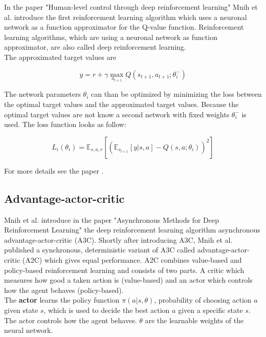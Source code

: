 In the paper "Human-level control through deep reinforcement learning" Mnih et al. \cite{dqn} introduce the first reinforcement learning algorithm which uses a neuronal network as a function approximator for the Q-value function. Reinforcement learning algorithms, which are using a neuronal network as function approximator, are also called deep reinforcement learning.\\

The approximated target values are

\begin{equation} \label{eq:1}
y = r + \gamma \max_{a_{t+1}} Q(s_{t+1}, a_{t+1}; \theta_i^-)
\end{equation}

The network parameters $\theta_i$ can than be optimized by minimizing the loss between the optimal target values and the approximated target values. Because the optimal target values are not know a second network with fixed weights $\theta_i^-$ is used. The loss function looks as follow:

\begin{equation} \label{eq:dqn_loss}
L_i(\theta_i) = \mathbb{E}_{s, a, r}[(\mathbb{E}_{s_{t+1}} [ y | s, a] - Q(s, a; \theta_i))^2]
\end{equation}


For more details see the paper \cite{dqn}.\\



\subsection{Advantage-actor-critic}
\label{sec:a2c}

Mnih et al. introduce in the paper "Asynchronous Methods for Deep Reinforcement Learning" \cite{A3C} the deep reinforcement learning algorithm asynchronous advantage-actor-critic (A3C). Shortly after introducing A3C, Mnih et al. published a synchronous, deterministic variant of A3C called advantage-actor-critic (A2C) which gives equal performance.
A2C combines value-based and policy-based reinforcement learning and consists of two parts. A critic which measures how good a taken action is (value-based) and an actor which controls how the agent behaves (policy-based).\\

The \textbf{actor} learns the policy function $\pi(a | s, \theta)$, probability of choosing action $a$ given state $s$, which is used to decide the best action $a$ given a specific state $s$.
The actor controls how the agent behaves.
$\theta$ are the learnable weights of the neural network. \\

